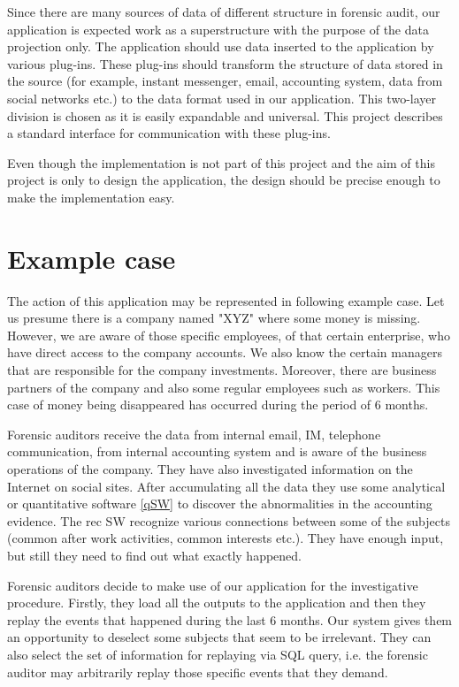 Since there are many sources of data of different structure in forensic audit, our application is expected work as a superstructure with the purpose of the data projection only. The application should use data inserted to the application by various plug-ins. These plug-ins should transform the structure of data stored in the source (for example, instant messenger, email, accounting system, data from social networks etc.) to the data format used in our application. This two-layer division is chosen as it is easily expandable and universal. This project describes a standard interface for communication with these plug-ins.


Even though the implementation is not part of this project and the aim of this project is only to design the application, the design should be precise enough to make the implementation easy. 


\section{Example case}

The action of this application may be represented in following example case. Let us presume there is a company named "XYZ" where some money is missing. However, we are aware of those specific employees, of that certain enterprise, who have direct access to the company accounts. We also know the certain managers that are responsible for the company investments. Moreover, there are business partners of the company and also some regular employees such as workers. This case of money being disappeared has occurred during the period of 6 months. 

Forensic auditors receive the data from internal email, IM, telephone communication, from internal accounting system and is aware of the business operations of the company. They have also investigated information on the Internet on social sites. After accumulating all the data they use some analytical or quantitative software \ref{qSW} to discover the abnormalities in the accounting evidence. The rec SW recognize various connections between some of the subjects (common after work activities, common interests etc.). They have enough input, but still they need to find out what exactly happened. 

Forensic auditors decide to make use of our application for the investigative procedure. Firstly, they load all the outputs to the application and then they replay the events that happened during the last 6 months. Our system gives them an opportunity to deselect some subjects that seem to be irrelevant. They can also select the set of information for replaying via SQL query, i.e. the forensic auditor may arbitrarily replay those specific events that they demand. 




